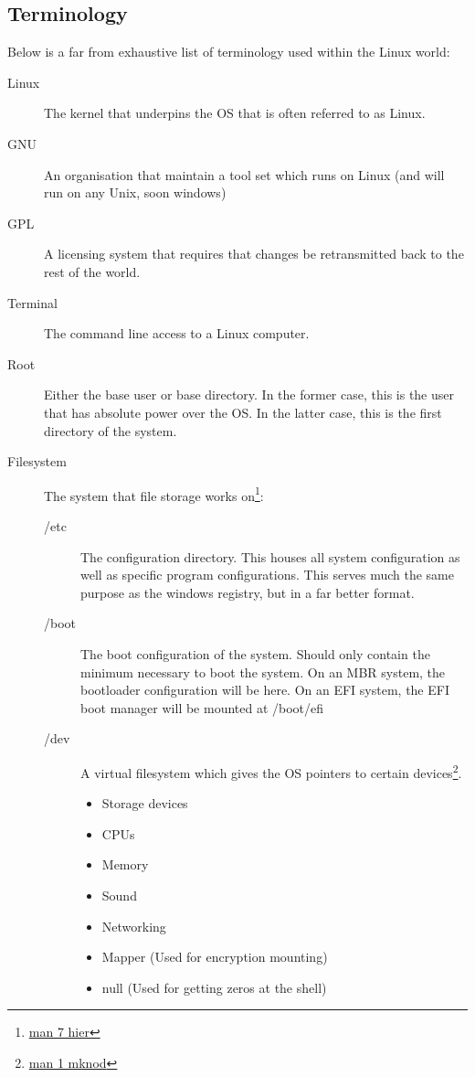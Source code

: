 		\subsection{Terminology}
			Below is a far from exhaustive list of terminology used within the Linux world:
			\begin{description}
				\item[Linux] The kernel that underpins the OS that is often referred to as Linux.
				\item[GNU] An organisation that maintain a tool set which runs on Linux (and will run on any Unix, soon windows)
				\item[GPL] A licensing system that requires that changes be retransmitted back to the rest of the world.
				\item[Terminal] The command line access to a Linux computer.
				\item[Root] Either the base user or base directory.
					In the former case, this is the user that has absolute power over the OS.
					In the latter case, this is the first directory of the system.
				\item[Filesystem] The system that file storage works on\footnote{\href{http://linux.die.net/man/7/hier}{man 7 hier}}:
				\begin{description}
					\item[/etc] The configuration directory.
						This houses all system configuration as well as specific program configurations.
						This serves much the same purpose as the windows registry, but in a far better format.
					\item[/boot] The boot configuration of the system.
						Should only contain the minimum necessary to boot the system.
						On an MBR system, the bootloader configuration will be here.
						On an EFI system, the EFI boot manager will be mounted at /boot/efi
					\item[/dev] A virtual filesystem which gives the OS pointers to certain devices\footnote{\href{http://linux.die.net/man/1/mknod}{man 1 mknod}}.
						\begin{itemize}
							\item Storage devices
							\item CPUs
							\item Memory
							\item Sound
							\item Networking
							\item Mapper (Used for encryption mounting)
							\item null (Used for getting zeros at the shell)

\end{itemize}
\end{description}
\end{description}
